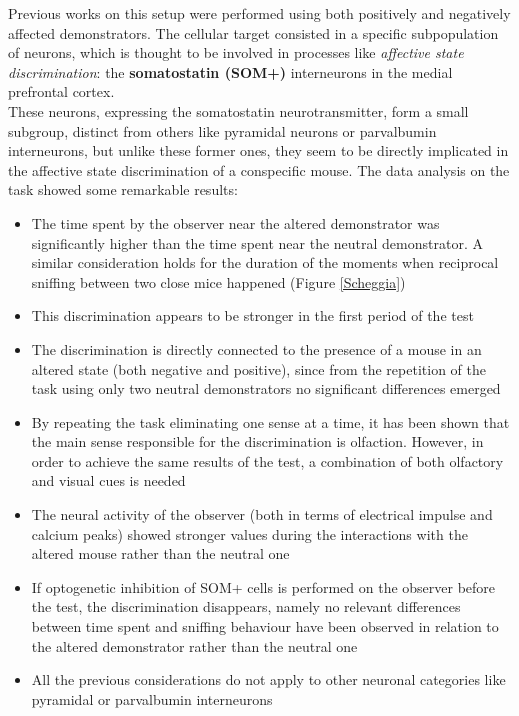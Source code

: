 \documentclass[12pt, a4paper]{report}
\begin{document}
Previous works on this setup \cite{8} %
 were performed using both positively and negatively affected demonstrators. The cellular target consisted in a specific subpopulation of neurons, which is thought to be involved in processes like \textit{affective state discrimination}: the \textbf{somatostatin (SOM+)} interneurons in the medial prefrontal cortex.\\
These neurons, expressing the somatostatin neurotransmitter, form a small
subgroup, distinct from others like pyramidal neurons or parvalbumin interneurons, but unlike these former ones, they seem to be directly implicated in the affective state discrimination of a conspecific mouse. The data analysis on the task showed some remarkable results:

 \begin{itemize}
 	
 	\item The time spent by the observer near the altered demonstrator was significantly higher than the time spent near the neutral demonstrator. A similar consideration holds for the duration of the moments when reciprocal sniffing between two close mice happened (Figure \ref{Scheggia})
 	
 	\item This  discrimination appears to be stronger in the first period of the test
 	
 	\item The discrimination is directly connected to the presence of a mouse in an altered state (both negative and positive), since from the repetition of the task using only two neutral demonstrators no significant differences emerged
 	
 	\item By repeating the task eliminating one sense at a time, it has been shown that the main sense responsible for the discrimination is olfaction. However, in order to achieve the same results of the test, a combination of both olfactory and visual cues is needed
 	
 	
 	\item The neural activity of the observer (both in terms of electrical impulse and  calcium peaks) showed stronger values during the interactions with the altered mouse rather than the neutral one
 	
 	\item If optogenetic inhibition of SOM+ cells \cite{41} is
 	performed on the observer before the test, the discrimination disappears, namely no relevant differences between time spent and sniffing behaviour have been observed in relation to the altered demonstrator rather than the neutral one
 	
 	
 	\item All the previous considerations do not apply to other neuronal categories like pyramidal or parvalbumin interneurons
 	 
 \end{itemize}
 
\end{document}
